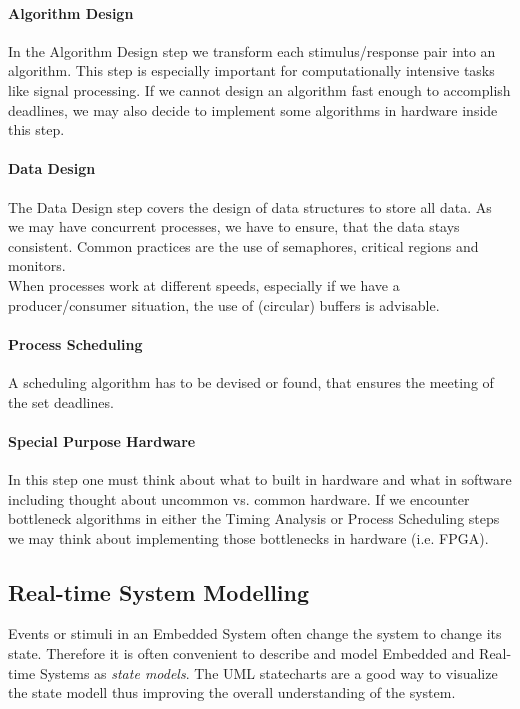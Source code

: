 \documentclass[10pt,a4paper,titlepage,draft]{report} %
\begin{document}
\paragraph{Algorithm Design}
In the Algorithm Design step we transform each stimulus/response pair into an algorithm.
This step is especially important for computationally intensive tasks like signal processing.
If we cannot design an algorithm fast enough to accomplish deadlines, we may also decide to implement some algorithms in hardware inside this step.

\paragraph{Data Design}
The Data Design step covers the design of data structures to store all data.
As we may have concurrent processes, we have to ensure, that the data stays consistent.
Common practices are the use of semaphores, critical regions and monitors. \\
When processes work at different speeds, especially if we have a producer/consumer situation, the use of (circular) buffers is advisable.

\paragraph{Process Scheduling}
A scheduling algorithm has to be devised or found, that ensures the meeting of the set deadlines.

\paragraph{Special Purpose Hardware}
In this step one must think about what to built in hardware and what in software including thought about uncommon vs. common hardware.
If we encounter bottleneck algorithms in either the Timing Analysis or Process Scheduling steps we may think about implementing those bottlenecks in hardware (i.e. FPGA).

\subsection{Real-time System Modelling}
Events or stimuli in an Embedded System often change the system to change its state.
Therefore it is often convenient to describe and model Embedded and Real-time Systems as \emph{state models}.
The UML statecharts are a good way to visualize the state modell thus improving the overall understanding of the system.
\end{document}
